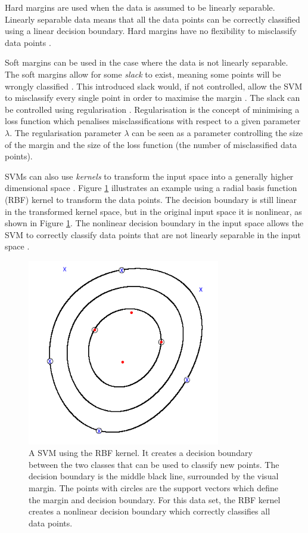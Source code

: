 Hard margins are used when the data is assumed to be linearly separable.
Linearly separable data means that all the data points can be correctly classified using a linear decision boundary.
Hard margins have no flexibility to misclassify data points \cite{Bishop2006}.

Soft margins can be used in the case where the data is not linearly separable.
The soft margins allow for some \emph{slack} to exist, meaning some points will be wrongly classified \cite{Cortes1995}.
This introduced slack would, if not controlled, allow the SVM to misclassify every single point in order to maximise the margin \cite{Bishop2006}. 
The slack can be controlled using regularisation \cite{Bishop2006}.
Regularisation is the concept of minimising a loss function which penalises misclassifications with respect to a given parameter $\lambda$.
The regularisation parameter $\lambda$ can be seen as a parameter controlling the size of the margin and the size of the loss function (the number of misclassified data points).

SVMs can also use \emph{kernels} to transform the input space into a generally higher dimensional space \cite{Bishop2006}.
Figure \ref{fig:svm-rbf} illustrates an example using a radial basis function (RBF) kernel to transform the data points.
The decision boundary is still linear in the transformed kernel space, but in the original input space it is nonlinear, as shown in Figure \ref{fig:svm-rbf}.
The nonlinear decision boundary in the input space allows the SVM to correctly classify data points that are not linearly separable in the input space \cite{Bishop2006}.

\begin{figure}
  \centering
    \includegraphics[width=0.75\textwidth]{figures/SVM_RBF_Circular}
  \caption{A SVM using the RBF kernel.
  It creates a decision boundary between the two classes that can be used to classify new points.
  The decision boundary is the middle black line, surrounded by the visual margin.
  The points with circles are the support vectors which define the margin and decision boundary.
  For this data set, the RBF kernel creates a nonlinear decision boundary which correctly classifies all data points.}
  \label{fig:svm-rbf}
\end{figure}

